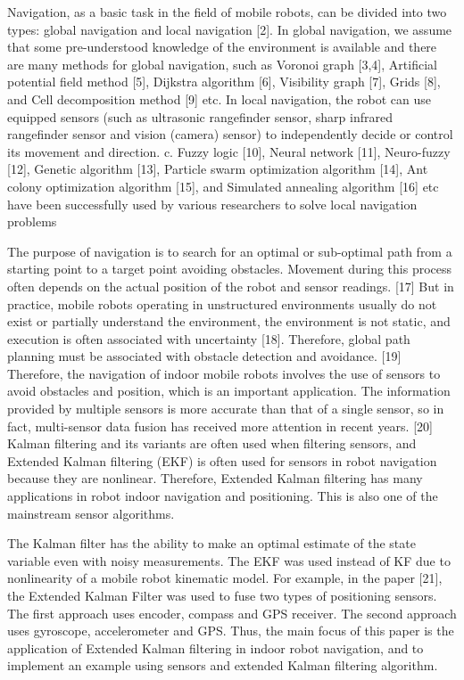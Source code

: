 \documentclass[conference]{IEEEtran}
\begin{document}
	Navigation, as a basic task in the field of mobile robots, can be divided into two types: global navigation and local navigation [2]. In global navigation, we assume that some pre-understood knowledge of the environment is available and there are many methods for global navigation, such as Voronoi graph [3,4], Artificial potential field method [5], Dijkstra algorithm [6], Visibility graph [7], Grids [8], and Cell decomposition method [9] etc. In local navigation, the robot can use equipped sensors (such as ultrasonic rangefinder sensor, sharp infrared rangefinder sensor and vision (camera) sensor) to independently decide or control its movement and direction. c. Fuzzy logic [10], Neural network [11], Neuro-fuzzy [12], Genetic algorithm [13], Particle swarm optimization algorithm [14], Ant colony optimization algorithm [15], and Simulated annealing algorithm [16] etc have been successfully used by various researchers to solve local navigation problems
	
	The purpose of navigation is to search for an optimal or sub-optimal path from a starting point to a target point avoiding obstacles. Movement during this process often depends on the actual position of the robot and sensor readings. [17] But in practice, mobile robots operating in unstructured environments usually do not exist or partially understand the environment, the environment is not static, and execution is often associated with uncertainty [18]. Therefore, global path planning must be associated with obstacle detection and avoidance. [19]
	Therefore, the navigation of indoor mobile robots involves the use of sensors to avoid obstacles and position, which is an important application. The information provided by multiple sensors is more accurate than that of a single sensor, so in fact, multi-sensor data fusion has received more attention in recent years. [20] Kalman filtering and its variants are often used when filtering sensors, and Extended Kalman filtering (EKF) is often used for sensors in robot navigation because they are nonlinear. Therefore, Extended Kalman filtering has many applications in robot indoor navigation and positioning. This is also one of the mainstream sensor algorithms.
	
	The Kalman filter has the ability to make an optimal estimate of the state variable even with noisy measurements. The EKF was used instead of KF due to nonlinearity of a mobile robot kinematic model. For example, in the paper [21], the Extended Kalman Filter was used to fuse two types of positioning sensors. The first approach uses encoder, compass and GPS receiver. The second approach uses gyroscope, accelerometer and GPS.
	Thus, the main focus of this paper is the application of Extended Kalman filtering in indoor robot navigation, and to implement an example using sensors and extended Kalman filtering algorithm.
	
\end{document}
